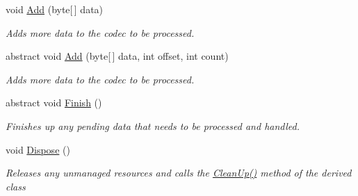 \begin{DoxyCompactItemize}
void \hyperlink{class_dot_z_lib_1_1_codec_base_a9131ff23312ada67dbf58f428d562de4}{Add} (byte\mbox{[}$\,$\mbox{]} data)
\begin{DoxyCompactList}\small\item\em Adds more data to the codec to be processed. \end{DoxyCompactList}\item 
abstract void \hyperlink{class_dot_z_lib_1_1_codec_base_ab01e6ad1d9c5b05745dd9e487aaa40ee}{Add} (byte\mbox{[}$\,$\mbox{]} data, int offset, int count)
\begin{DoxyCompactList}\small\item\em Adds more data to the codec to be processed. \end{DoxyCompactList}\item 
abstract void \hyperlink{class_dot_z_lib_1_1_codec_base_abab96cb01a9b983452a31777e3a1e633}{Finish} ()
\begin{DoxyCompactList}\small\item\em Finishes up any pending data that needs to be processed and handled. \end{DoxyCompactList}\item 
void \hyperlink{class_dot_z_lib_1_1_codec_base_ab4bdcee97631d9e80d2bceb01d01f368}{Dispose} ()
\begin{DoxyCompactList}\small\item\em Releases any unmanaged resources and calls the \hyperlink{class_dot_z_lib_1_1_codec_base_aa0ded075105c5cf6f5f0d61928c90ca6}{Clean\+Up()} method of the derived class \end{DoxyCompactList}\end{DoxyCompactItemize}
